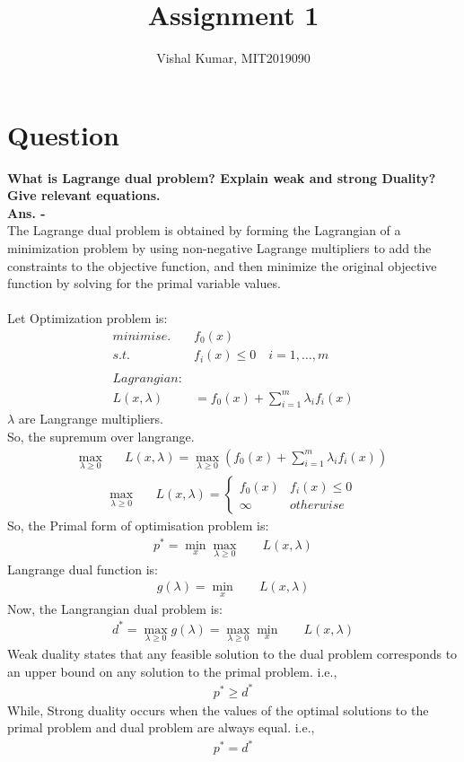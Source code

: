 \documentclass[fleqn]{article}
\title{Assignment 1}
\author{Vishal Kumar, MIT2019090}
\date{}
\begin{document}
\maketitle

\section*{Question}
{\bf What is Lagrange dual problem? Explain weak and strong Duality? Give relevant equations.}
\\
{\bf Ans. -} 
\\
The Lagrange dual problem is obtained by forming the Lagrangian of a minimization problem by using non-negative Lagrange multipliers to add the constraints to the objective function, and then minimize the original objective function by solving for the primal variable values.
\\
\\
Let Optimization problem is:
\begin{align*}
minimise. \quad& f_0(x)\\
s.t. \quad& f_i(x) \le 0 \quad i=1,\ldots,m\\
\\
Lagrangian:\\
L(x,\lambda) &= f_0(x) + \sum_{i=1}^m \lambda_i f_i(x)
\end{align*}
$\lambda$ are Langrange multipliers.
\\
So, the supremum over langrange.
\begin{align*}
\max_{\lambda \geq 0} \quad& L(x,\lambda) = \max_{\lambda \geq 0} (f_0(x) + \sum_{i=1}^m \lambda_i f_i(x))
\end{align*}
\begin{align*}
\max_{\lambda \geq 0} \quad& L(x,\lambda) = \begin{cases}f_0(x) & f_i(x) \le 0\\ \infty & otherwise
\end{cases}
\end{align*}
So, the Primal form of optimisation problem is:
\begin{align*}
p^* = \min_{x}\max_{\lambda \geq 0}\quad& L(x,\lambda)
\end{align*}
Langrange dual function is:
\begin{align*}
g(\lambda) = \min_{x}\quad& L(x,\lambda)
\end{align*}
Now, the Langrangian dual problem is:
\begin{align*}
d^* = \max_{\lambda \geq 0} g(\lambda) = \max_{\lambda \geq 0}\min_{x}\quad& L(x,\lambda)
\end{align*}
Weak duality states that any feasible solution to the dual problem corresponds to an upper bound on any solution to the primal problem. i.e.,
\begin{align*}
p^* \geq d^*
\end{align*}
While, Strong duality occurs when the values of the optimal solutions to the primal problem and dual problem are always equal. i.e.,
\begin{align*}
p^* = d^*
\end{align*}
\end{document}
